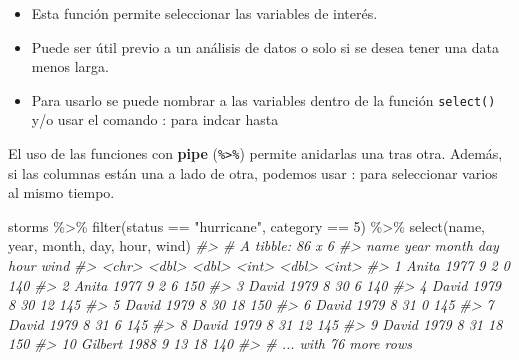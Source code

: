 \documentclass[
]{book}
\newenvironment{Shaded}{\begin{snugshade}}{\end{snugshade}}
\newcommand{\CommentTok}[1]{\textcolor[rgb]{0.56,0.35,0.01}{\textit{#1}}}
\newcommand{\DecValTok}[1]{\textcolor[rgb]{0.00,0.00,0.81}{#1}}
\newcommand{\FunctionTok}[1]{\textcolor[rgb]{0.00,0.00,0.00}{#1}}
\newcommand{\NormalTok}[1]{#1}
\newcommand{\SpecialCharTok}[1]{\textcolor[rgb]{0.00,0.00,0.00}{#1}}
\newcommand{\StringTok}[1]{\textcolor[rgb]{0.31,0.60,0.02}{#1}}
\begin{document}
\begin{itemize}
\item
  Esta función permite seleccionar las variables de interés.
\item
  Puede ser útil previo a un análisis de datos o solo si se desea tener una data menos larga.
\item
  Para usarlo se puede nombrar a las variables dentro de la función \texttt{select()} y/o usar el comando : para indcar hasta
\end{itemize}

El uso de las funciones con \textbf{pipe} (\texttt{\%\textgreater{}\%}) permite anidarlas una tras otra. Además, si las columnas están una a lado de otra, podemos usar : para seleccionar varios al mismo tiempo.

\begin{Shaded}
\begin{Highlighting}[]
\NormalTok{storms }\SpecialCharTok{\%\textgreater{}\%} 
  \FunctionTok{filter}\NormalTok{(status }\SpecialCharTok{==} \StringTok{"hurricane"}\NormalTok{,}
\NormalTok{         category }\SpecialCharTok{==} \DecValTok{5}\NormalTok{) }\SpecialCharTok{\%\textgreater{}\%} 
  \FunctionTok{select}\NormalTok{(name, year, month, day, hour, wind)}
\CommentTok{\#\textgreater{} \# A tibble: 86 x 6}
\CommentTok{\#\textgreater{}    name     year month   day  hour  wind}
\CommentTok{\#\textgreater{}    \textless{}chr\textgreater{}   \textless{}dbl\textgreater{} \textless{}dbl\textgreater{} \textless{}int\textgreater{} \textless{}dbl\textgreater{} \textless{}int\textgreater{}}
\CommentTok{\#\textgreater{}  1 Anita    1977     9     2     0   140}
\CommentTok{\#\textgreater{}  2 Anita    1977     9     2     6   150}
\CommentTok{\#\textgreater{}  3 David    1979     8    30     6   140}
\CommentTok{\#\textgreater{}  4 David    1979     8    30    12   145}
\CommentTok{\#\textgreater{}  5 David    1979     8    30    18   150}
\CommentTok{\#\textgreater{}  6 David    1979     8    31     0   145}
\CommentTok{\#\textgreater{}  7 David    1979     8    31     6   145}
\CommentTok{\#\textgreater{}  8 David    1979     8    31    12   145}
\CommentTok{\#\textgreater{}  9 David    1979     8    31    18   150}
\CommentTok{\#\textgreater{} 10 Gilbert  1988     9    13    18   140}
\CommentTok{\#\textgreater{} \# ... with 76 more rows}
\end{Highlighting}
\end{Shaded}
\end{document}
